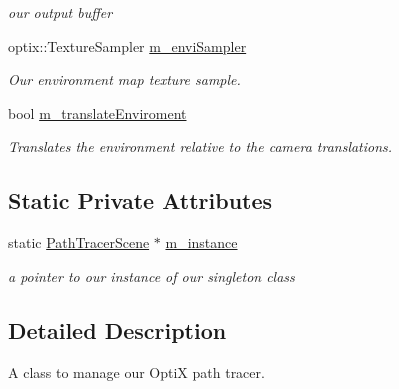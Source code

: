 \begin{DoxyCompactItemize}
\begin{DoxyCompactList}\small\item\em our output buffer \end{DoxyCompactList}\item 
\hypertarget{class_path_tracer_scene_a2c0d1db397274c91a36c599c2a45e0cd}{optix\-::\-Texture\-Sampler \hyperlink{class_path_tracer_scene_a2c0d1db397274c91a36c599c2a45e0cd}{m\-\_\-envi\-Sampler}}\label{class_path_tracer_scene_a2c0d1db397274c91a36c599c2a45e0cd}

\begin{DoxyCompactList}\small\item\em Our environment map texture sample. \end{DoxyCompactList}\item 
\hypertarget{class_path_tracer_scene_a2e82b5dd4468dd9c70202e4627523f93}{bool \hyperlink{class_path_tracer_scene_a2e82b5dd4468dd9c70202e4627523f93}{m\-\_\-translate\-Enviroment}}\label{class_path_tracer_scene_a2e82b5dd4468dd9c70202e4627523f93}

\begin{DoxyCompactList}\small\item\em Translates the environment relative to the camera translations. \end{DoxyCompactList}\end{DoxyCompactItemize}
\subsection*{Static Private Attributes}
\begin{DoxyCompactItemize}
\item 
\hypertarget{class_path_tracer_scene_a6f3e9f04a5c6cb4ec630eaf7820a2992}{static \hyperlink{class_path_tracer_scene}{Path\-Tracer\-Scene} $\ast$ \hyperlink{class_path_tracer_scene_a6f3e9f04a5c6cb4ec630eaf7820a2992}{m\-\_\-instance}}\label{class_path_tracer_scene_a6f3e9f04a5c6cb4ec630eaf7820a2992}

\begin{DoxyCompactList}\small\item\em a pointer to our instance of our singleton class \end{DoxyCompactList}\end{DoxyCompactItemize}


\subsection{Detailed Description}
A class to manage our Opti\-X path tracer. 

